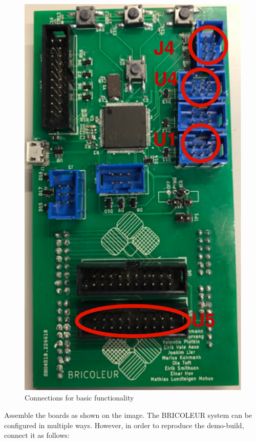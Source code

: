 \begin{figure}
    \centering
    \includegraphics[scale=0.2]{Images/PCB_CONN.png}
    \caption{Connections for basic functionality}
    \label{fig:pcb_connections}
\end{figure}

Assemble the boards as shown on the image. The BRICOLEUR system can be configured in multiple ways. However, in order to reproduce the demo-build, connect it as follows:


